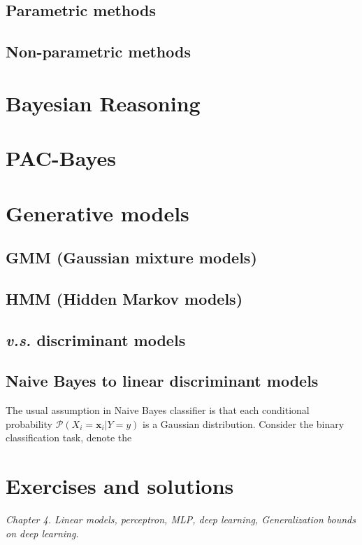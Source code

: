 \documentclass{article}
\begin{document}
	\subsection{Parametric methods}
	\subsection{Non-parametric methods}

\section{Bayesian Reasoning}

\section{PAC-Bayes}

\section{Generative models}
	\subsection{GMM (Gaussian mixture models)}
	\subsection{HMM (Hidden Markov models)}
	\subsection{\textit{v.s.} discriminant models}
	\subsection{Naive Bayes to linear discriminant models}
	The usual assumption in Naive Bayes classifier is that each conditional probability $\mathcal{P} (X_i=\mathbf{x}_i|Y=y)$ is a Gaussian distribution. Consider the binary classification task, denote the 

\section{Exercises and solutions}

\textit{
      Chapter 4. Linear models, perceptron, MLP, deep learning, Generalization bounds on deep learning.}
\end{document}
